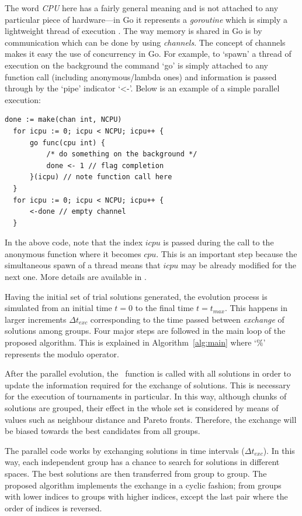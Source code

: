 \documentclass[final,5p,times,twocolumn]{elsarticle}
\begin{document}
The word \emph{CPU} here has a fairly general meaning and is not attached to any particular piece of
hardware---in Go it represents a \emph{goroutine} which is simply a lightweight thread of execution
\citep{golang:16}. The way memory is shared in Go is by communication which can be done by using
\emph{channels}. The concept of channels makes it easy the use of concurrency in Go. For example, to
`spawn' a thread of execution on the background the command `{\ttfamily go}' is simply attached to
any function call (including anonymous/lambda ones) and information is passed through by the `pipe'
indicator `{\ttfamily <-}'. Below is an example of a simple parallel execution:
{
\begin{Verbatim}[samepage=true]
  done := make(chan int, NCPU)
  for icpu := 0; icpu < NCPU; icpu++ {
      go func(cpu int) {
          /* do something on the background */
          done <- 1 // flag completion
      }(icpu) // note function call here
  }
  for icpu := 0; icpu < NCPU; icpu++ {
      <-done // empty channel
  }
\end{Verbatim}
}
\noindent In the above code, note that the index $icpu$ is passed during the call to the anonymous
function where it becomes $cpu$. This is an important step because the simultaneous spawn of a
thread means that $icpu$ may be already modified for the next one. More details are available in
\citep{golang:16}.

Having the initial set of trial solutions generated, the evolution process is simulated from an
initial time $t=0$ to the final time $t=t_{max}$. This happens in larger increments $\Delta t_{exc}$
corresponding to the time passed between \emph{exchange} of solutions among groups. Four major steps
are followed in the main loop of the proposed algorithm. This is explained in
Algorithm~\ref{alg:main} where `$\%$' represents the modulo operator.

After the parallel evolution, the \FnMetrics~function is called with all solutions in order to
update the information required for the exchange of solutions. This is necessary for the execution
of tournaments in particular. In this way, although chunks of solutions are grouped, their effect in
the whole set is considered by means of values such as neighbour distance and Pareto fronts.
Therefore, the exchange will be biased towards the best candidates from all groups.

The parallel code works by exchanging solutions in time intervals ($\Delta t_{exc}$). In this way,
each independent group has a chance to search for solutions in different spaces. The best solutions
are then transferred from group to group. The proposed algorithm implements the exchange in a cyclic
fashion; from groups with lower indices to groups with higher indices, except the last pair where
the order of indices is reversed.
\end{document}

